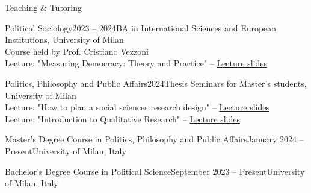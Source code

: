 \documentclass{cv} %
\begin{document}
\begin{rSection}{Teaching \& Tutoring}

\subtitle{Guest Lectures}

\begin{rTeachingSection}{Political Sociology}{2023 -- 2024}{BA in International Sciences and European Institutions, University of Milan}\\ 
Course held by Prof. Cristiano Vezzoni \\    
Lecture: "Measuring Democracy: Theory and Practice" -- \href{https://github.com/ste-sangiovanni/democracy_seminar}{Lecture slides}   
\end{rTeachingSection}
\begin{rTeachingSection}{Politics, Philosophy and Public Affairs}{2024}{Thesis Seminars for Master's students, University of Milan} \\ 
Lecture: "How to plan a social sciences research design" -- \href{https://github.com/ste-sangiovanni/PPPA_Thesis_Seminar}{Lecture slides}  \\ 
Lecture: "Introduction to Qualitative Research" -- \href{https://github.com/ste-sangiovanni/PPPA_Thesis_Seminar}{Lecture slides}   
\end{rTeachingSection}
    
\subtitle{Academic Tutoring \& Teaching Assistant}

\begin{rTeachingSection}{Master’s Degree Course in Politics, Philosophy and Public Affairs}{January 2024  -- Present}{University of Milan, Italy}
\end{rTeachingSection} 
\begin{rTeachingSection}{Bachelor’s Degree Course in Political Science}{September 2023 -- Present}{University of Milan, Italy}
\end{rTeachingSection} 
\end{rSection}
    
\newpage
\end{document}

